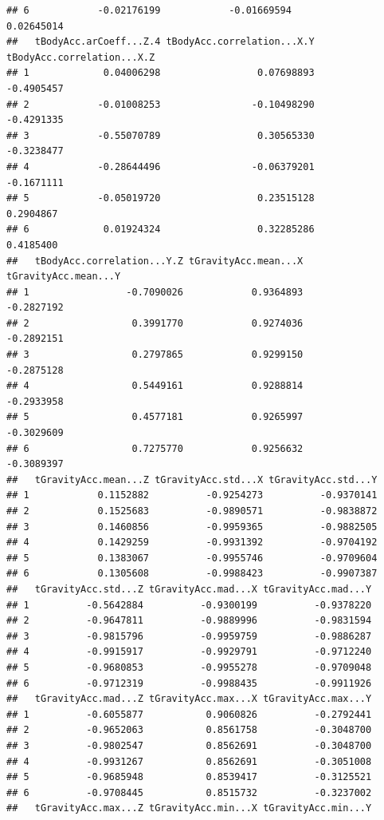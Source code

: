 \documentclass[
]{article}
\begin{document}
\begin{verbatim}
## 6            -0.02176199            -0.01669594             0.02645014
##   tBodyAcc.arCoeff...Z.4 tBodyAcc.correlation...X.Y tBodyAcc.correlation...X.Z
## 1             0.04006298                 0.07698893                 -0.4905457
## 2            -0.01008253                -0.10498290                 -0.4291335
## 3            -0.55070789                 0.30565330                 -0.3238477
## 4            -0.28644496                -0.06379201                 -0.1671111
## 5            -0.05019720                 0.23515128                  0.2904867
## 6             0.01924324                 0.32285286                  0.4185400
##   tBodyAcc.correlation...Y.Z tGravityAcc.mean...X tGravityAcc.mean...Y
## 1                 -0.7090026            0.9364893           -0.2827192
## 2                  0.3991770            0.9274036           -0.2892151
## 3                  0.2797865            0.9299150           -0.2875128
## 4                  0.5449161            0.9288814           -0.2933958
## 5                  0.4577181            0.9265997           -0.3029609
## 6                  0.7275770            0.9256632           -0.3089397
##   tGravityAcc.mean...Z tGravityAcc.std...X tGravityAcc.std...Y
## 1            0.1152882          -0.9254273          -0.9370141
## 2            0.1525683          -0.9890571          -0.9838872
## 3            0.1460856          -0.9959365          -0.9882505
## 4            0.1429259          -0.9931392          -0.9704192
## 5            0.1383067          -0.9955746          -0.9709604
## 6            0.1305608          -0.9988423          -0.9907387
##   tGravityAcc.std...Z tGravityAcc.mad...X tGravityAcc.mad...Y
## 1          -0.5642884          -0.9300199          -0.9378220
## 2          -0.9647811          -0.9889996          -0.9831594
## 3          -0.9815796          -0.9959759          -0.9886287
## 4          -0.9915917          -0.9929791          -0.9712240
## 5          -0.9680853          -0.9955278          -0.9709048
## 6          -0.9712319          -0.9988435          -0.9911926
##   tGravityAcc.mad...Z tGravityAcc.max...X tGravityAcc.max...Y
## 1          -0.6055877           0.9060826          -0.2792441
## 2          -0.9652063           0.8561758          -0.3048700
## 3          -0.9802547           0.8562691          -0.3048700
## 4          -0.9931267           0.8562691          -0.3051008
## 5          -0.9685948           0.8539417          -0.3125521
## 6          -0.9708445           0.8515732          -0.3237002
##   tGravityAcc.max...Z tGravityAcc.min...X tGravityAcc.min...Y

\end{verbatim}
\end{document}
